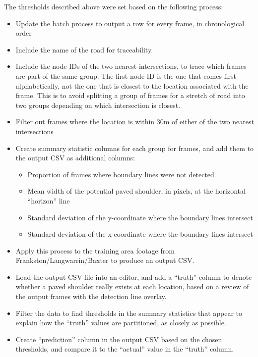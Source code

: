 \documentclass[11pt,twoside]{report}
\begin{document}
The thresholds described above were set based on the following process:

\begin{itemize}
\item{Update the batch process to output a row for every frame, in chronological order}
\item{Include the name of the road for traceability.}
\item{Include the node IDs of the two nearest intersections, to trace which frames are part of the same group.  The first node ID is the one that comes first alphabetically, not the one that is closest to the location associated with the frame.  This is to avoid splitting a group of frames for a stretch of road into two groups depending on which intersection is closest.}
\item{Filter out frames where the location is within 30m of either of the two nearest intersections}
\item{Create summary statistic columns for each group for frames, and add them to the output CSV as additional columns:
	\begin{itemize}
	\item{Proportion of frames where boundary lines were not detected}
	\item{Mean width of the potential paved shoulder, in pixels, at the horizontal ``horizon'' line}
	\item{Standard deviation of the y-coordinate where the boundary lines intersect}
	\item{Standard deviation of the x-coordinate where the boundary lines intersect}
	\end{itemize}
}
\item{Apply this process to the training area footage from Frankston/Langwarrin/Baxter to produce an output CSV.}
\item{Load the output CSV file into an editor, and add a ``truth'' column to denote whether a paved shoulder really exists at each location, based on a review of the output frames with the detection line overlay.}
\item{Filter the data to find thresholds in the summary statistics that appear to explain how the ``truth'' values are partitioned, as closely as possible.}
\item{Create ``prediction'' column in the output CSV based on the chosen thresholds, and compare it to the ``actual'' value in the ``truth'' column.}
\end{itemize}
\end{document}
